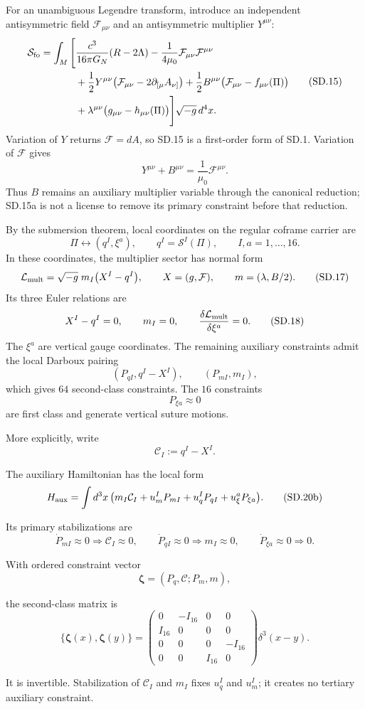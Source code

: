 \documentclass[10pt]{article}
\begin{document}
For an unambiguous Legendre transform, introduce an independent antisymmetric
field $\mathcal F_{\mu\nu}$ and an antisymmetric multiplier $Y^{\mu\nu}$:
\[
\begin{aligned}
\mathcal S_{\rm fo}=\int_M\Bigg[&\frac{c^3}{16\pi G_N}(R-2\Lambda)
-\frac1{4\mu_0}\mathcal F_{\mu\nu}\mathcal F^{\mu\nu}\\
&+\frac12Y^{\mu\nu}\bigl(\mathcal F_{\mu\nu}-2\partial_{[\mu}A_{\nu]}\bigr)
+\frac12B^{\mu\nu}\bigl(\mathcal F_{\mu\nu}-f_{\mu\nu}(\Pi)\bigr)\\
&+\lambda^{\mu\nu}\bigl(g_{\mu\nu}-h_{\mu\nu}(\Pi)\bigr)\Bigg]
\sqrt{-g}\,d^4x.
\end{aligned}
\tag{SD.15}
\]
Variation of $Y$ returns $\mathcal F=dA$, so SD.15 is a first-order form of
SD.1. Variation of $\mathcal F$ gives
\[
Y^{\mu\nu}+B^{\mu\nu}=\frac{1}{\mu_0}\mathcal F^{\mu\nu}.
\tag{SD.15a}
\]
Thus $B$ remains an auxiliary multiplier variable through the canonical
reduction; SD.15a is not a license to remove its primary constraint before
that reduction.

By the submersion theorem, local coordinates on the regular coframe carrier
are
\[
\Pi\longleftrightarrow(q^I,\xi^a),
\qquad
q^I=\mathscr S^I(\Pi),
\qquad I,a=1,\ldots,16.
\tag{SD.16}
\]
In these coordinates, the multiplier sector has normal form
\[
\mathcal L_{\rm mult}=\sqrt{-g}\;m_I\bigl(X^I-q^I\bigr),
\qquad
X=(g,\mathcal F),
\qquad
m=(\lambda,B/2).
\tag{SD.17}
\]
Its three Euler relations are
\[
X^I-q^I=0,
\qquad m_I=0,
\qquad \frac{\delta\mathcal L_{\rm mult}}{\delta\xi^a}=0.
\tag{SD.18}
\]
The $\xi^a$ are vertical gauge coordinates. The remaining auxiliary
constraints admit the local Darboux pairing
\[
(P_{qI},q^I-X^I),
\qquad
(P_{mI},m_I),
\tag{SD.19}
\]
which gives $64$ second-class constraints. The $16$ constraints
\[
P_{\xi a}\approx0
\tag{SD.20}
\]
are first class and generate vertical suture motions.

More explicitly, write
\[
\mathcal C_I:=q^I-X^I.
\tag{SD.20a}
\]
\par\noindent
The auxiliary Hamiltonian has the local form
\[
H_{\rm aux}=\int d^3x\,
\bigl(m_I\mathcal C_I
+u_m^IP_{mI}+u_q^IP_{qI}+u_\xi^aP_{\xi a}\bigr).
\tag{SD.20b}
\]
\par\noindent
Its primary stabilizations are
\[
\dot P_{mI}\approx0\Longrightarrow\mathcal C_I\approx0,
\qquad
\dot P_{qI}\approx0\Longrightarrow m_I\approx0,
\qquad
\dot P_{\xi a}\approx0\Longrightarrow0.
\tag{SD.20c}
\]
\par\noindent
With ordered constraint vector
\[
\boldsymbol\zeta=(P_q,\mathcal C;P_m,m),
\tag{SD.20d}
\]
\par\noindent
the second-class matrix is
\[
\{\boldsymbol\zeta(x),\boldsymbol\zeta(y)\}
=
\begin{pmatrix}
0&-I_{16}&0&0\\
I_{16}&0&0&0\\
0&0&0&-I_{16}\\
0&0&I_{16}&0
\end{pmatrix}\delta^3(x-y).
\tag{SD.20e}
\]
\par\noindent
It is invertible. Stabilization of $\mathcal C_I$ and $m_I$ fixes
$u_q^I$ and $u_m^I$; it creates no tertiary auxiliary constraint.
\end{document}
